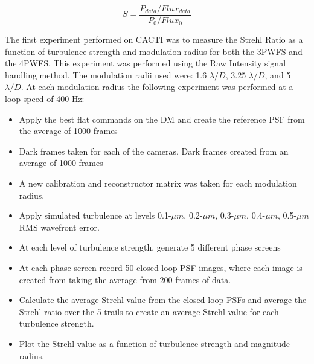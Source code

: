 \begin{equation}
    S=\frac{P_{data}/Flux_{data}}{P_{0}/Flux_{0}}
    \label{Strehl}
\end{equation}

The first experiment performed on CACTI was to measure the Strehl Ratio as a function of turbulence strength and modulation radius for both the 3PWFS and the 4PWFS.  This experiment was performed using the Raw Intensity signal handling method. The modulation radii used were: 1.6 $\lambda/D$, 3.25 $\lambda/D$, and 5 $\lambda/D$. At each modulation radius the following experiment was performed at a loop speed of 400-Hz:

\begin{itemize}
    \item Apply the best flat commands on the DM and create the reference PSF from the average of 1000 frames
    \item Dark frames taken for each of the cameras. Dark frames created from an average of 1000 frames
    \item A new calibration and reconstructor matrix was taken for each modulation radius.
    \item Apply simulated turbulence at levels 0.1-$\mu m$, 0.2-$\mu m$, 0.3-$\mu m$, 0.4-$\mu m$, 0.5-$\mu m$ RMS wavefront error. 
    \item At each level of turbulence strength, generate 5 different phase screens
    \item At each phase screen record 50 closed-loop PSF images, where each image is created from taking the average from 200 frames of data. 
    \item Calculate the average Strehl value from the closed-loop PSFs and average the Strehl ratio over the 5 trails to create an average Strehl value for each turbulence strength.
    \item Plot the Strehl value as a function of turbulence strength and magnitude radius. 
    

\end{itemize}





	
 



